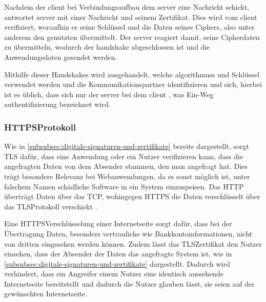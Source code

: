 Nachdem der \gls{client} bei Verbindungsaufbau dem \gls{server} eine Nachricht schickt, antwortet \gls{server} mit einer Nachricht und seinem Zertifikat.
Dies wird vom \gls{client} verifiziert, woraufhin er seine Schlüssel und die Daten seines Ciphers, also unter anderem den genutzten  übermittelt.
Der \gls{server} reagiert damit, seine Cipherdaten zu übermitteln, wodurch der \gls{handshake} abgeschlossen ist und die Anwendungsdaten gesendet werden.

Mithilfe dieser Handshakes wird ausgehandelt, welche  \glspl{algorithmus} und Schlüssel verwendet werden und die Kommunikationspartner identifizieren und  sich, hierbei ist es üblich, dass sich nur der \gls{server} bei dem \gls{client} , was Ein-Weg \gls{authentifizierung} bezeichnet wird\autocite[\vglf][]{morrissey-tls-2010}.

\subsubsection[HTTPS-Protocol]{\ac{HTTPS}\nonbreakdash Protokoll}\label{subsubsec:HTTPS-Protocol}

Wie in \autoref{subsubsec:digitale-signaturen-und-zertifikate} bereits dargestellt, sorgt \ac{TLS} dafür, dass eine Anwendung oder ein Nutzer verifizieren kann, dass die angefragten Daten von dem Absender stammen, den man angefragt hat.
Dies trägt besondere Relevanz bei Webanwendungen, da es sonst möglich ist, unter falschem Namen schädliche Software in ein System einzuspeisen.
Das \ac{HTTP} überträgt Daten über das \ac{TCP}, wohingegen \ac{HTTPS} die Daten verschlüsselt über das \ac{TLS}\nonbreakdash Protokoll verschickt \autocites{2674005.2674991:online}{RFC5246T44:online}.

Eine \ac{HTTPS}\nonbreakdash Verschlüsselung einer Internetseite sorgt dafür, dass bei der Übertragung Daten, besonders vertrauliche wie \zb Bankkontoinformationen, nicht von dritten eingesehen werden können\autocite[\vglf][]{CloudfareWarumHTTPS:online}.
Zudem lässt das \ac{TLS}\nonbreakdash Zertifikat den Nutzer einsehen, dass der Absender der Daten das angefragte System ist, wie in \autoref{subsubsec:digitale-signaturen-und-zertifikate} dargestellt.
Dadurch wird verhindert, dass ein Angreifer einem Nutzer eine identisch aussehende Internetseite bereitstellt und dadurch die Nutzer glauben lässt, sie seien auf der gewünschten Internetseite\autocite[\vglf][]{CloudfareWarumHTTPS:online}.


